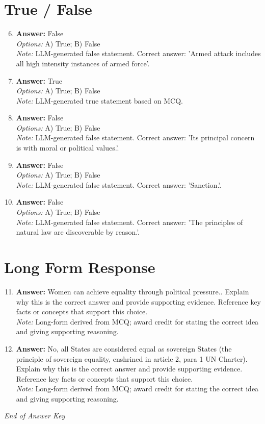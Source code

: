 \documentclass[12pt]{article}
\begin{document}
\section*{True / False}
\begin{enumerate}[label=\arabic*.]
\setcounter{enumi}{5}
\item \textbf{Answer:} False
\\ \textit{Options:} A) True; B) False
\\ \textit{Note:} LLM-generated false statement. Correct answer: 'Armed attack includes all high intensity instances of armed force'.
\item \textbf{Answer:} True
\\ \textit{Options:} A) True; B) False
\\ \textit{Note:} LLM-generated true statement based on MCQ.
\item \textbf{Answer:} False
\\ \textit{Options:} A) True; B) False
\\ \textit{Note:} LLM-generated false statement. Correct answer: 'Its principal concern is with moral or political values.'.
\item \textbf{Answer:} False
\\ \textit{Options:} A) True; B) False
\\ \textit{Note:} LLM-generated false statement. Correct answer: 'Sanction.'.
\item \textbf{Answer:} False
\\ \textit{Options:} A) True; B) False
\\ \textit{Note:} LLM-generated false statement. Correct answer: 'The principles of natural law are discoverable by reason.'.
\end{enumerate}

\section*{Long Form Response}
\begin{enumerate}[label=\arabic*.]
\setcounter{enumi}{10}
\item \textbf{Answer:} Women can achieve equality through political pressure.. Explain why this is the correct answer and provide supporting evidence. Reference key facts or concepts that support this choice.
\\ \textit{Note:} Long-form derived from MCQ; award credit for stating the correct idea and giving supporting reasoning.
\item \textbf{Answer:} No, all States are considered equal as sovereign States (the principle of sovereign equality, enshrined in article 2, para 1 UN Charter). Explain why this is the correct answer and provide supporting evidence. Reference key facts or concepts that support this choice.
\\ \textit{Note:} Long-form derived from MCQ; award credit for stating the correct idea and giving supporting reasoning.
\end{enumerate}

\vfill
\noindent\textit{End of Answer Key}
\end{document}
